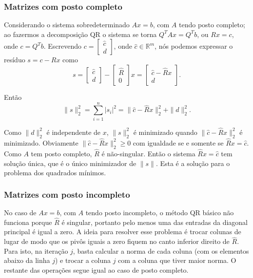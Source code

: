 \documentclass[a4paper,11pt]{article}
\begin{document}
        \subsubsection{Matrizes com posto completo}
            Considerando o sistema sobredeterminado $Ax=b$, com $A$ tendo posto completo; ao fazermos a decomposição QR o sistema se torna $Q^TAx=Q^Tb$, ou $Rx=c$, onde $c=Q^Tb$. Escrevendo $c = \begin{bmatrix}\hat{c} \\ d\end{bmatrix}$, onde $\hat{c} \in \mathbb{R}^m$, nós podemos expressar o resíduo $s=c-Rx$ como
            $$
                s = \begin{bmatrix}\hat{c} \\ d\end{bmatrix} - \begin{bmatrix}\hat{R} \\ 0\end{bmatrix} x = \begin{bmatrix} \hat{c} - \hat{R}x \\ d\end{bmatrix}.
            $$
            
            Então
            $$
                \|s\|^2_2 = \sum_{i=1}^{n}|s_i|^2 = \| \hat{c} - \hat{R}x \|^2_2 +  \|d\|^2_2.
            $$
            
            Como $\|d\|^2_2$ é independente de $x$, $\|s\|^2_2$ é minimizado quando $\| \hat{c} - \hat{R}x \|^2_2$ é minimizado. Obviamente $\| \hat{c} - \hat{R}x \|^2_2 \geq 0$ com igualdade se e somente se $\hat{R}x = \hat{c}$. Como $A$ tem posto completo, $\hat{R}$ é não-singular. Então o sistema $\hat{R}x = \hat{c}$ tem solução única, que é o único minimizador de $\|s\|$. Esta é a solução para o problema dos quadrados mínimos.
            
        \subsubsection{Matrizes com posto incompleto}
            No caso de $Ax=b$, com $A$ tendo posto incompleto, o método QR básico não funciona porque $\hat{R}$ é singular, portanto pelo menos uma das entradas da diagonal principal é igual a zero. A ideia para resolver esse problema é trocar colunas de lugar de modo que os pivôs iguais a zero fiquem no canto inferior direito de $\hat{R}$. Para isto, na iteração $j$, basta calcular a norma de cada coluna (com os elementos abaixo da linha $j$) e trocar a coluna $j$ com a coluna que tiver maior norma. O restante das operações segue igual ao caso de posto completo.
            
\end{document}
